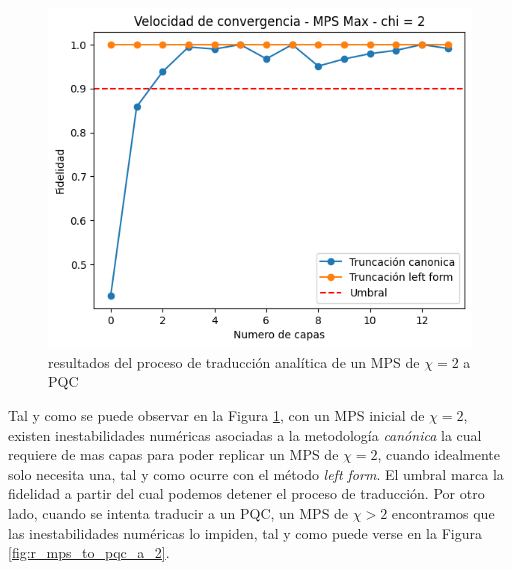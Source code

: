 \begin{figure}[!h]
    \centering
    \includegraphics[scale = 0.6]{plt/a02-mps_to_pqc_a.png}
    \caption{resultados del proceso de traducción analítica de un MPS de $\chi = 2$ a PQC}
    \label{fig:r_mps_to_pqc_a}
\end{figure}

\newpage

Tal y como se puede observar en la Figura \ref{fig:r_mps_to_pqc_a}, con un MPS inicial de $\chi = 2$, existen inestabilidades numéricas asociadas a la metodología  \textit{canónica} la cual requiere de mas capas para poder replicar un MPS de $\chi = 2$, cuando idealmente solo necesita una, tal y como ocurre con el método \textit{left form}. El umbral marca la fidelidad a partir del cual podemos detener el proceso de traducción. Por otro lado, cuando se intenta traducir a un PQC, un MPS de $\chi > 2$ encontramos que las inestabilidades numéricas lo impiden, tal y como puede verse en la Figura \ref{fig:r_mps_to_pqc_a_2}.


